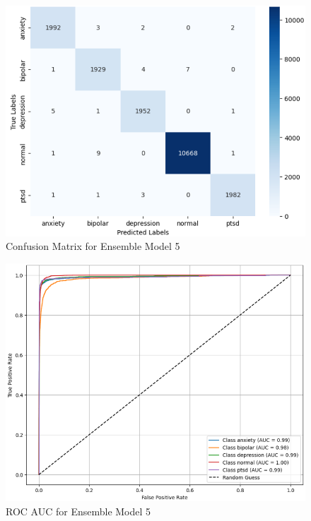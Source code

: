 \begin{figure}[h!]  
    \centering
    \includegraphics[width=1.0\textwidth]{Images/BEM CM.png}  
    \caption{Confusion Matrix for Ensemble Model 5}
    \label{dfdl1244883}  %
\end{figure}

\begin{figure}[h!]  
    \centering
    \includegraphics[width=1.0\textwidth]{Images/BEM ROC.png}  
    \caption{ROC AUC for Ensemble Model 5}
    \label{dfdl1244883}  %
\end{figure}

